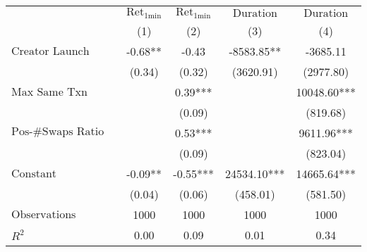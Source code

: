 \begin{tabular}{lcccc}
\hline
 & $\text{Ret}_{\text{1min}}$ & $\text{Ret}_{\text{1min}}$ & $\text{Duration}$ & $\text{Duration}$ \\
 & (1) & (2) & (3) & (4)\\
\hline
$\text{Creator Launch Bundle}$ & -0.68** & -0.43 & -8583.85** & -3685.11 \\
 & (0.34) & (0.32) & (3620.91) & (2977.80) \\
$\text{Max Same Txn}$ &  & 0.39*** &  & 10048.60*** \\
 &  & (0.09) &  & (819.68) \\
$\text{Pos-\#Swaps Ratio}$ &  & 0.53*** &  & 9611.96*** \\
 &  & (0.09) &  & (823.04) \\
$\text{Constant}$ & -0.09** & -0.55*** & 24534.10*** & 14665.64*** \\
 & (0.04) & (0.06) & (458.01) & (581.50) \\
$\text{Observations}$ & 1000 & 1000 & 1000 & 1000 \\
$R^2$ & 0.00 & 0.09 & 0.01 & 0.34 \\
\hline
\end{tabular}